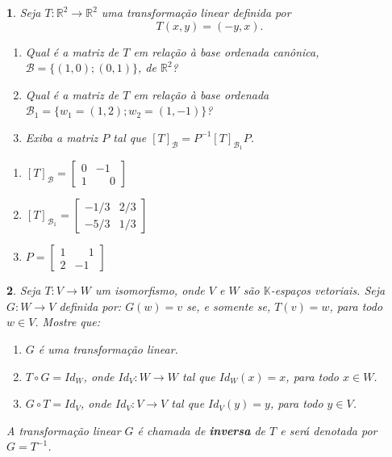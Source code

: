 \documentclass[12pt]{exam}
\newtheorem{exercicio}{}
\newcommand{\real}{\mathbb{R}}
\newcommand{\cp}[1]{\mathbb{#1}}
\begin{document}
\begin{exercicio}
  Seja $T : \real^2 \to \real^2$ uma transforma\c{c}\~ao linear definida por
  \[
    T(x,y) = (-y,x).
  \]
  \begin{enumerate}[label=({\alph*})]
    \item Qual \'e a matriz de $T$ em rela\c{c}\~ao \`a base ordenada can\^onica, $\mathcal{B} = \{(1,0); (0,1)\}$, de $\real^2$?
    \item Qual \'e a matriz de $T$ em rela\c{c}\~ao \`a base ordenada $\mathcal{B}_1 = \{w_1 = (1,2); w_2 = (1,-1)\}$?
    \item Exiba a matriz $P$ tal que $[T]_{\mathcal{B}} = P^{-1}[T]_{\mathcal{B}_1}P$.
  \end{enumerate}
  \begin{solucao}
    \begin{enumerate}[label=({\alph*})]
      \item $[T]_\mathcal{B} = \begin{bmatrix}
        0 & -1\\
        1 & \phantom{-}0
      \end{bmatrix}$
      \item $[T]_{\mathcal{B}_1} = \begin{bmatrix}
        -1/3 & 2/3\\
        -5/3 & 1/3
      \end{bmatrix}$
      \item $P = \begin{bmatrix}
        1 & \phantom{-}1\\
        2 & -1
      \end{bmatrix}$
    \end{enumerate}
  \end{solucao}
\end{exercicio}

\begin{exercicio}
  Seja $T : V \to W$ um isomorfismo, onde $V$ e $W$ s\~ao $\cp{K}$-espa\c{c}os vetoriais. Seja $G : W \to V$ definida por: $G(w) = v$ se, e somente se, $T(v) = w$, para todo $w \in V$. Mostre que:
  \begin{enumerate}[label=({\alph*})]
    \item $G$ \'e uma transforma\c{c}\~ao linear.
    \item $T\circ G = Id_W$, onde $Id_V : W \to W$ tal que $Id_W(x) = x$, para todo $x \in W$.
    \item $G\circ T = Id_V$, onde $Id_V : V \to V$ tal que $Id_V(y) = y$, para todo $y \in V$.
  \end{enumerate}
  A transforma\c{c}\~ao linear $G$ \'e chamada de \textbf{inversa} de $T$ e ser\'a denotada por $G = T^{-1}$.
\end{exercicio}
\end{document}
